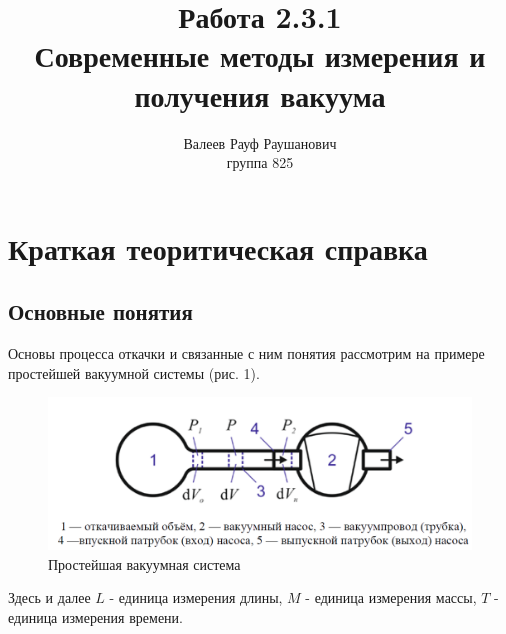 \documentclass[a4paper, 12pt]{article}%
\author{Валеев Рауф Раушанович \\
группа 825}
\title{\textbf{Работа 2.3.1 \\ 
Современные методы измерения и получения вакуума}}
\begin{document}
\maketitle
\section*{Краткая теоритическая справка}
\subsection*{Основные понятия}
Основы процесса откачки и связанные с ним понятия рассмотрим на примере простейшей вакуумной системы (рис. 1).

\begin{figure}[h]
\includegraphics[width = \textwidth]{231_3.png}
\caption{Простейшая вакуумная система}
\end{figure}
Здесь и далее $L$ - единица измерения длины, $M$ - единица измерения массы, $T$ - единица измерения времени.
\end{document}
